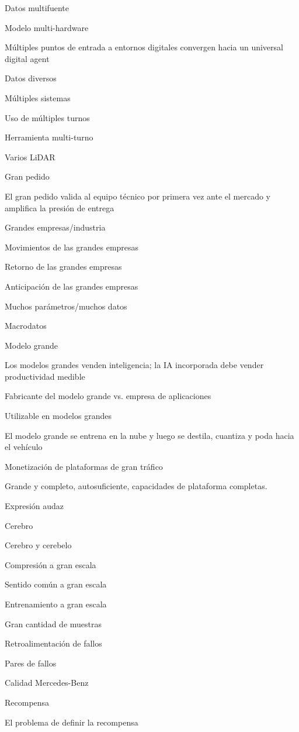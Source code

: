 \documentclass{article}
\begin{document}
Datos multifuente

Modelo multi-hardware

Múltiples puntos de entrada a entornos digitales convergen hacia un universal digital agent

Datos diversos

Múltiples sistemas

Uso de múltiples turnos

Herramienta multi-turno

Varios LiDAR

Gran pedido

El gran pedido valida al equipo técnico por primera vez ante el mercado y amplifica la presión de entrega

Grandes empresas/industria

Movimientos de las grandes empresas

Retorno de las grandes empresas

Anticipación de las grandes empresas

Muchos parámetros/muchos datos

Macrodatos

Modelo grande

Los modelos grandes venden inteligencia; la IA incorporada debe vender productividad medible

Fabricante del modelo grande vs. empresa de aplicaciones

Utilizable en modelos grandes

El modelo grande se entrena en la nube y luego se destila, cuantiza y poda hacia el vehículo

Monetización de plataformas de gran tráfico

Grande y completo, autosuficiente, capacidades de plataforma completas.

Expresión audaz

Cerebro

Cerebro y cerebelo

Compresión a gran escala

Sentido común a gran escala

Entrenamiento a gran escala

Gran cantidad de muestras

Retroalimentación de fallos

Pares de fallos

Calidad Mercedes-Benz

Recompensa

El problema de definir la recompensa
\end{document}
